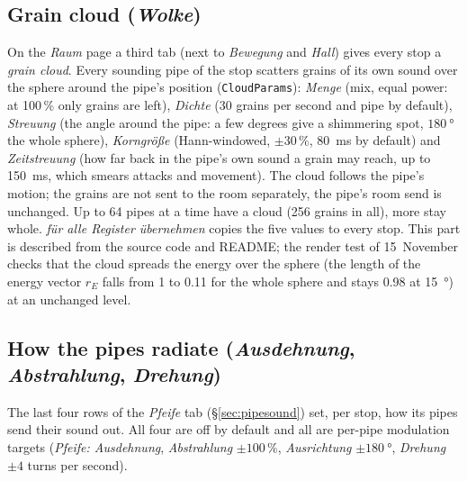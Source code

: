 \documentclass[11pt,a4paper,parskip=half,DIV=11,toc=bibliography]{scrartcl}
\newcommand{\ui}[1]{\emph{#1}}                 %
\newcommand{\fn}[1]{\mbox{\texttt{#1}}}
\begin{document}
\subsection{Grain cloud (\ui{Wolke})}
\label{sec:cloud}
On the \ui{Raum} page a third tab (next to \ui{Bewegung} and \ui{Hall}) gives every stop a \emph{grain cloud}.
Every sounding pipe of the stop scatters grains of its own sound over the sphere around the pipe's position
(\fn{CloudParams}): \ui{Menge} (mix, equal power: at 100\,\% only grains are left), \ui{Dichte} (30 grains per
second and pipe by default), \ui{Streuung} (the angle around the pipe: a few degrees give a shimmering spot,
$\SI{180}{\degree}$ the whole sphere), \ui{Korngröße} (Hann-windowed, $\pm30\,\%$, \SI{80}{ms} by default) and
\ui{Zeitstreuung} (how far back in the pipe's own sound a grain may reach, up to \SI{150}{ms}, which smears attacks
and movement). The cloud follows the pipe's motion; the grains are not sent to the room separately, the pipe's room
send is unchanged. Up to 64 pipes at a time have a cloud (256 grains in all), more stay whole.
\ui{für alle Register übernehmen} copies the five values to every stop. This part is described from the
source code and README; the render test of 15~November checks that the cloud spreads the energy over the sphere (the length of the
energy vector $r_E$ falls from 1 to 0.11 for the whole sphere and stays 0.98 at \SI{15}{\degree}) at an unchanged level.

\subsection{How the pipes radiate (\ui{Ausdehnung}, \ui{Abstrahlung}, \ui{Drehung})}
\label{sec:radiate}
The last four rows of the \ui{Pfeife} tab (\S\ref{sec:pipesound}) set, per stop, how its pipes send their sound out. All four are
off by default and all are per-pipe modulation targets (\ui{Pfeife: Ausdehnung}, \ui{Abstrahlung} $\pm100\,\%$, \ui{Ausrichtung}
$\pm\SI{180}{\degree}$, \ui{Drehung} $\pm4$ turns per second).
\end{document}
